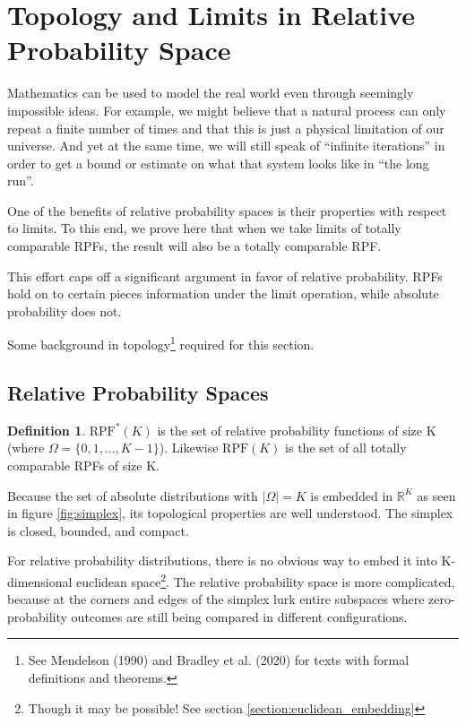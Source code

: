 \documentclass[twoside]{article}
\newcommand{\quotes}[1]{``#1''}
\theoremstyle{plain}%
\theoremstyle{definition}
\newtheorem{definition}{Definition}[section]
\theoremstyle{remark}
\begin{document}
\section{Topology and Limits in Relative Probability Space}
\label{section:topology}

Mathematics can be used to model the real world even through seemingly impossible ideas. For example, we might believe that a natural process can only repeat a finite number of times and that this is just a physical limitation of our universe. And yet at the same time, we will still speak of \quotes{infinite iterations} in order to get a bound or estimate on what that system looks like in \quotes{the long run}.

One of the benefits of relative probability spaces is their properties with respect to limits. To this end, we prove here that when we take limits of totally comparable RPFs, the result will also be a totally comparable RPF.

This effort caps off a significant argument in favor of relative probability. RPFs hold on to certain pieces information under the limit operation, while absolute probability does not.

Some background in topology\footnote{See Mendelson (1990) \cite{mendelson} and Bradley et al. (2020) \cite{bradley} for texts with formal definitions and theorems.} required for this section.

\subsection{Relative Probability Spaces}

\begin{definition}
\(\text{RPF}^{\ast}(K)\) is the set of relative probability functions of size K (where \(\Omega = \{0, 1, ..., K - 1\}\)). Likewise \(\text{RPF}(K)\) is the set of all totally comparable RPFs of size K.
\end{definition}

Because the set of absolute distributions with \(|\Omega| = K\) is embedded in \(\mathbb{R}^K\) as seen in figure \ref{fig:simplex}, its topological properties are well understood. The simplex is closed, bounded, and compact.

For relative probability distributions, there is no obvious way to embed it into K-dimensional euclidean space\footnote{Though it may be possible! See section \ref{section:euclidean_embedding}}. The relative probability space is more complicated, because at the corners and edges of the simplex lurk entire subspaces where zero-probability outcomes are still being compared in different configurations.
\end{document}
